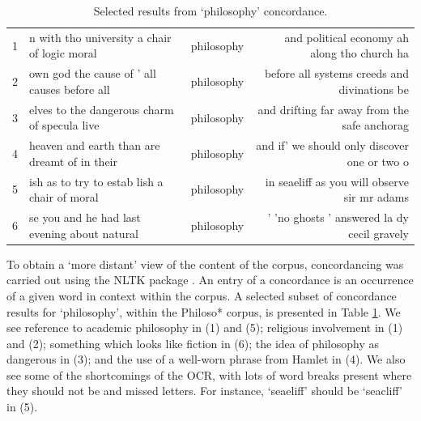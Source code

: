 \documentclass{article}
\begin{document}
\begin{table}[]
        \footnotesize
        \centering
        \begin{tabular}{l|lcr}
        1 & n with tho university a chair of logic moral & philosophy & and political economy ah along tho church ha \\
        2 & own god the cause of ' all causes before all & philosophy & before all systems creeds and divinations be \\
        3 & elves to the dangerous charm of specula live & philosophy & and drifting far away from the safe anchorag \\
        4 & heaven and earth than are dreamt of in their & philosophy & and if' we should only discover one or two o \\
        5 & ish as to try to estab lish a chair of moral & philosophy & in seaeliff as you will observe sir mr adams \\
        6 & se you and he had last evening about natural & philosophy & ' 'no ghosts ' answered la dy cecil gravely \\
        \end{tabular}
        \caption{Selected results from `philosophy' concordance.}
        \label{t:corpus-concordance}
\end{table}

To obtain a `more distant' view of the content of the corpus, concordancing was carried out using the NLTK package \cite{bird-2009}. An entry of a concordance is an occurrence of a given word in context within the corpus. A selected subset of concordance results for `philosophy', within the Philoso* corpus, is presented in Table \ref{t:corpus-concordance}. We see reference to academic philosophy in (1) and (5); religious involvement in (1) and (2); something which looks like fiction in (6); the idea of philosophy as dangerous in (3); and the use of a well-worn phrase from Hamlet in (4). We also see some of the shortcomings of the OCR, with lots of word breaks present where they should not be and missed letters. For instance, `seaeliff' should be `seacliff' in (5).
\end{document}
